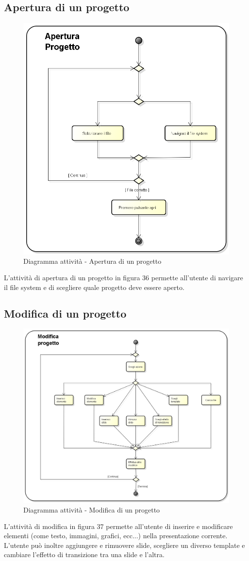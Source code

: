 \subsection{Apertura di un progetto}
\begin{figure}[h] 
	\centering 
	\includegraphics[width=0.7\linewidth] {img/activity_apertura.png}
	\caption{Diagramma attività - Apertura di un progetto} 
\end{figure}
L'attività di apertura di un progetto in figura 36 permette all'utente di navigare il file system e di scegliere quale progetto deve essere aperto.
\newpage

\subsection{Modifica di un progetto}
\begin{figure}[h] 
	\centering 
	\includegraphics[width=0.9\linewidth] {img/activity_modifica.png}
	\caption{Diagramma attività - Modifica di un progetto} 
\end{figure}
L'attività di modifica in figura 37 permette all'utente di inserire e modificare elementi (come testo, immagini, grafici, ecc...) nella presentazione corrente. L'utente può inoltre aggiungere e rimuovere \gls{slide}, scegliere un diverso \gls{template} e cambiare l'effetto di transizione tra una \gls{slide} e l'altra.
\newpage

